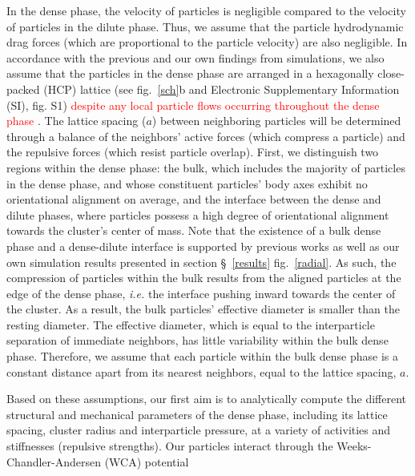 \documentclass[twoside,twocolumn,9pt]{article}
\begin{document}
In the dense phase, the velocity of particles is 
negligible compared to the velocity of particles in the dilute phase. Thus, we assume that the particle hydrodynamic drag forces (which are proportional to the particle velocity) are also negligible. In accordance with the previous and our own findings from simulations, we also assume that the particles in the dense phase are arranged in a hexagonally close-packed (HCP) lattice \cite{Redner2013} (see fig.~\ref{sch}b and Electronic Supplementary Information (SI), fig. S1) \textcolor{red}{despite any local particle flows occurring throughout the dense phase \cite{Caprini2020}}. The lattice spacing ($a$) between neighboring particles will be determined through a balance of the neighbors' active forces (which compress a particle) and the repulsive forces (which resist particle overlap). First, we distinguish two regions within the dense phase: the bulk, which includes the majority of particles in the dense phase, and whose constituent particles' body axes exhibit no orientational alignment on average, and the interface between the dense and dilute phases, where particles possess a high degree of orientational alignment towards the cluster's center of mass. Note that the existence of a bulk dense phase and a dense-dilute interface is supported by previous works \cite{Paliwal2018, Solon2018, Hermann2019} as well as our own simulation results presented in section \S~\ref{results} fig.~\ref{radial}. As such, the compression of particles within the bulk results from the aligned particles at the edge of the dense phase, \textit{i.e.} the interface pushing inward towards the center of the cluster. As a result, the bulk particles' effective diameter is smaller than the resting diameter. The effective diameter, which is equal to the interparticle separation of immediate neighbors, has little variability within the bulk dense phase.  Therefore, we assume that each particle within the bulk dense phase is a constant distance apart from its nearest neighbors, equal to the lattice spacing, $a$. 

Based on these assumptions, our first aim is to analytically compute the different structural and mechanical parameters of the dense phase, including its lattice spacing, cluster radius and interparticle pressure, at a variety of activities and stiffnesses (repulsive strengths).
Our particles interact through the Weeks-Chandler-Andersen (WCA) potential
\end{document}
